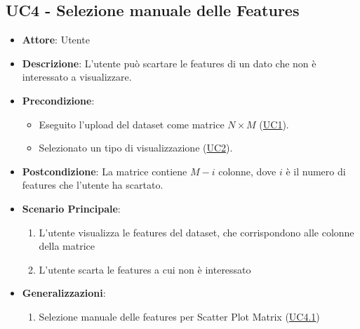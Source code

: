 \subsection{UC4 - Selezione manuale delle Features}
\label{uc4}
    \begin{itemize}
    \item \textbf{Attore}: Utente
    \item \textbf{Descrizione}: L'utente può scartare le features di un dato che non è interessato a visualizzare.
    \item \textbf{Precondizione}: 
     \begin{itemize}
        \item Eseguito l'upload del dataset come matrice $N\times M$ (\hyperref[uc1]{UC1}).
        \item Selezionato un tipo di visualizzazione (\hyperref[uc2]{UC2}).
    \end{itemize}
    \item \textbf{Postcondizione}: La matrice contiene $M-i$ colonne, dove $i$ è il numero di features che l'utente ha scartato.
    \item \textbf{Scenario Principale}: 
    \begin{enumerate}
        \item L'utente visualizza le features del dataset, che corrispondono alle colonne della matrice
        \item L'utente scarta le features a cui non è interessato
    \end{enumerate}
    \item \textbf{Generalizzazioni}:
        \begin{enumerate}
            \item Selezione manuale delle features per Scatter Plot Matrix (\hyperref[uc4.1]{UC4.1})
        \end{enumerate}
    \end{itemize}
    
